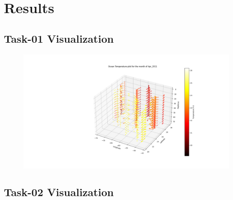 \section{Results}
\subsection{Task-01 Visualization}

\begin{figure}[ht]
    \centering
    \includegraphics[width = 0.8\linewidth]{figures/oceanTemp.png}
\end{figure}

\subsection{Task-02 Visualization}


